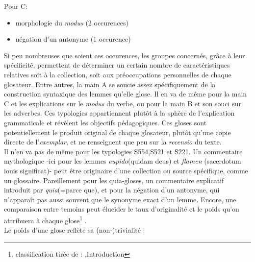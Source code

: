 \documentclass[a4paper, twoside, 12pt]{book}
\begin{document}
Pour C:

\begin{itemize}
    \item {} morphologie du \textit{modus} (2 occurences)
    \item {} négation d'un antonyme (1 occurence)
\end{itemize}

Si peu nombreuses que soient ces occurences, les groupes concernés, grâce à leur spécificité, permettent de déterminer un certain nombre de caractéristiques relatives soit à la collection, soit aux préoccupations personnelles de chaque glosateur. Entre autres, la main A se soucie assez spécifiquement de la construction syntaxique des lemmes qu'elle glose. Il en va de même pour la main C et les explications sur le \textit{modus} du verbe, ou pour la main B et son souci sur les adverbes. Ces typologies appartiennent plutôt à la sphère de l'explication grammaticale et révèlent les objectifs pédagogiques. Ces gloses sont potentiellement le produit original de chaque glosateur, plutôt qu'une copie directe de l'\textit{exemplar}, et ne renseignent que peu sur la \textit{recensio} du texte.\\

Il n'en va pas de même pour les typologies S554,S521 et S221. Un commentaire mythologique -ici pour les lemmes \textit{cupido}(quidam deus) et \textit{flamen} (sacerdotum iouis significat)- peut être originaire d'une collection ou source spécifique, comme un glossaire. Pareillement pour les \og{}quia-gloses\fg{}, un commentaire explicatif introduit par \textit{quia}(=parce que), et pour la négation d'un antonyme, qui n'apparaît pas aussi souvent que le synonyme exact d'un lemme. Encore, une comparaison entre temoins peut élucider le taux  d'originalité et le \og{}poids\fg{} qu'on attribuera à chaque glose\footnote{classification tirée de : \cite{steinova2021glosses},Introduction} .\\

Le poids d'une glose reflète sa (non-)trivialité :
\end{document}
